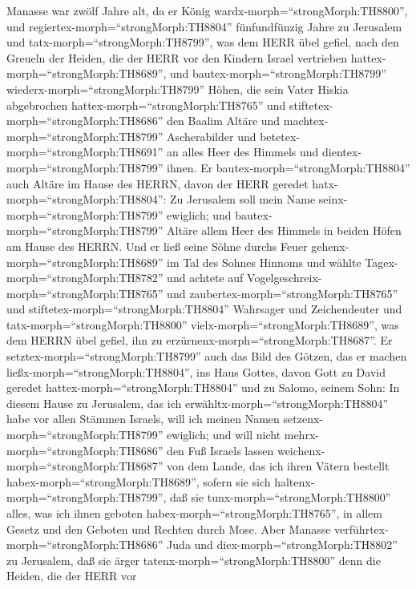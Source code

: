  Manasse war zwölf Jahre alt, da er König
wardx-morph=``strongMorph:TH8800'', und
regiertex-morph=``strongMorph:TH8804'' fünfundfünzig Jahre zu Jerusalem
 und tatx-morph=``strongMorph:TH8799'', was dem HERR übel
gefiel, nach den Greueln der Heiden, die der HERR vor den Kindern Israel
vertrieben hattex-morph=``strongMorph:TH8689'',  und
bautex-morph=``strongMorph:TH8799'' wiederx-morph=``strongMorph:TH8799''
Höhen, die sein Vater Hiskia abgebrochen
hattex-morph=``strongMorph:TH8765'' und
stiftetex-morph=``strongMorph:TH8686'' den Baalim Altäre und
machtex-morph=``strongMorph:TH8799'' Ascherabilder und
betetex-morph=``strongMorph:TH8691'' an alles Heer des Himmels und
dientex-morph=``strongMorph:TH8799'' ihnen.  Er
bautex-morph=``strongMorph:TH8804'' auch Altäre im Hause des HERRN,
davon der HERR geredet hatx-morph=``strongMorph:TH8804'': Zu Jerusalem
soll mein Name seinx-morph=``strongMorph:TH8799'' ewiglich; 
und bautex-morph=``strongMorph:TH8799'' Altäre allem Heer des Himmels in
beiden Höfen am Hause des HERRN.  Und er ließ seine Söhne
durchs Feuer gehenx-morph=``strongMorph:TH8689'' im Tal des Sohnes
Hinnoms und wählte Tagex-morph=``strongMorph:TH8782'' und achtete auf
Vogelgeschreix-morph=``strongMorph:TH8765'' und
zaubertex-morph=``strongMorph:TH8765'' und
stiftetex-morph=``strongMorph:TH8804'' Wahrsager und Zeichendeuter und
tatx-morph=``strongMorph:TH8800'' vielx-morph=``strongMorph:TH8689'',
was dem HERRN übel gefiel, ihn zu
erzürnenx-morph=``strongMorph:TH8687''.  Er
setztex-morph=``strongMorph:TH8799'' auch das Bild des Götzen, das er
machen ließx-morph=``strongMorph:TH8804'', ins Haus Gottes, davon Gott
zu David geredet hattex-morph=``strongMorph:TH8804'' und zu Salomo,
seinem Sohn: In diesem Hause zu Jerusalem, das ich
erwähltx-morph=``strongMorph:TH8804'' habe vor allen Stämmen Israels,
will ich meinen Namen setzenx-morph=``strongMorph:TH8799'' ewiglich;
 und will nicht mehrx-morph=``strongMorph:TH8686'' den Fuß
Israels lassen weichenx-morph=``strongMorph:TH8687'' von dem Lande, das
ich ihren Vätern bestellt habex-morph=``strongMorph:TH8689'', sofern sie
sich haltenx-morph=``strongMorph:TH8799'', daß sie
tunx-morph=``strongMorph:TH8800'' alles, was ich ihnen geboten
habex-morph=``strongMorph:TH8765'', in allem Gesetz und den Geboten und
Rechten durch Mose.  Aber Manasse
verführtex-morph=``strongMorph:TH8686'' Juda und
diex-morph=``strongMorph:TH8802'' zu Jerusalem, daß sie ärger
tatenx-morph=``strongMorph:TH8800'' denn die Heiden, die der HERR vor
